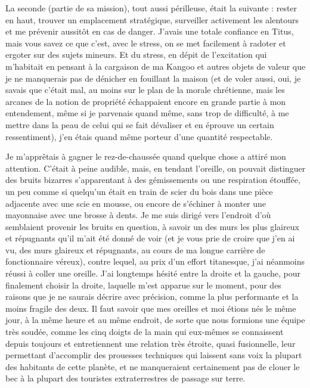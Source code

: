 La seconde (partie de sa mission), tout aussi périlleuse, était la suivante : rester en haut, trouver un emplacement stratégique, surveiller activement les alentours et me prévenir aussitôt en cas de danger. J’avais une totale confiance en Titus, mais vous savez ce que c’est, avec le stress, on se met facilement à radoter et ergoter sur des sujets mineurs. Et du stress, en dépit de l’excitation qui m’habitait en pensant à la cargaison de ma Kangoo et autres objets de valeur que je ne manquerais pas de dénicher en fouillant la maison (et de voler aussi, oui, je savais que c’était mal, au moins sur le plan de la morale chrétienne, mais les arcanes de la notion de propriété échappaient encore en grande partie à mon entendement, même si je parvenais quand même, sans trop de difficulté, à me mettre dans la peau de celui qui se fait dévaliser et en éprouve un certain ressentiment), j’en étais quand même porteur d’une quantité respectable.

Je m’apprêtais à gagner le rez-de-chaussée quand quelque chose a attiré mon attention. C’était à peine audible, mais, en tendant l’oreille, on pouvait distinguer des bruits bizarres s’apparentant à des gémissements ou une respiration étouffée, un peu comme si quelqu’un était en train de scier du bois dans une pièce adjacente avec une scie en mousse, ou encore de s’échiner à monter une mayonnaise avec une brosse à dents. Je me suis dirigé vers l’endroit d’où semblaient provenir les bruits en question, à savoir un des murs les plus glaireux et répugnants qu’il m’ait été donné de voir (et je vous prie de croire que j’en ai vu, des murs glaireux et répugnants, au cours de ma longue carrière de fonctionnaire véreux), contre lequel, au prix d’un effort titanesque, j’ai néanmoins réussi à coller une oreille. J’ai longtemps hésité entre la droite et la gauche, pour finalement choisir la droite, laquelle m’est apparue sur le moment, pour des raisons que je ne saurais décrire avec précision, comme la plus performante et la moins fragile des deux. Il faut savoir que mes oreilles et moi étions nés le même jour, à la même heure et au même endroit, de sorte que nous formions une équipe très soudée, comme les cinq doigts de la main qui eux-mêmes se connaissent depuis toujours et entretiennent une relation très étroite, quasi fusionnelle, leur permettant d’accomplir des prouesses techniques qui laissent sans voix la plupart des habitants de cette planète, et ne manqueraient certainement pas de clouer le bec à la plupart des touristes extraterrestres de passage sur terre.

